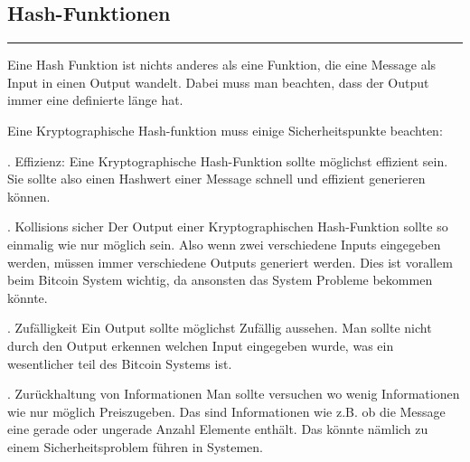 \vspace*{1mm}
\subsection*{Hash-Funktionen}
\vspace{-10mm}
\noindent\rule{0.8\textwidth}{0.4pt}

\vspace{5mm}

\noindent
Eine Hash Funktion ist nichts anderes als eine Funktion, die eine Message als Input in einen Output wandelt. Dabei muss man beachten, dass der Output immer eine definierte länge hat.

\noindent
Eine Kryptographische Hash-funktion muss einige Sicherheitspunkte beachten:

. Effizienz:
Eine Kryptographische Hash-Funktion sollte möglichst effizient sein. Sie sollte also einen Hashwert einer Message schnell und effizient generieren können.

. Kollisions sicher
Der Output einer Kryptographischen Hash-Funktion sollte so einmalig wie nur möglich sein. Also wenn zwei verschiedene Inputs eingegeben werden, müssen immer verschiedene Outputs generiert werden.
Dies ist vorallem beim Bitcoin System wichtig, da ansonsten das System Probleme bekommen könnte.

. Zufälligkeit
Ein Output sollte möglichst Zufällig aussehen. Man sollte nicht durch den Output erkennen welchen Input eingegeben wurde, was ein wesentlicher teil des Bitcoin Systems ist.

. Zurückhaltung von Informationen
Man sollte versuchen wo wenig Informationen wie nur möglich Preiszugeben. Das sind Informationen wie z.B. ob die Message eine gerade oder ungerade Anzahl Elemente enthält.
Das könnte nämlich zu einem Sicherheitsproblem führen in Systemen.



\newpage
